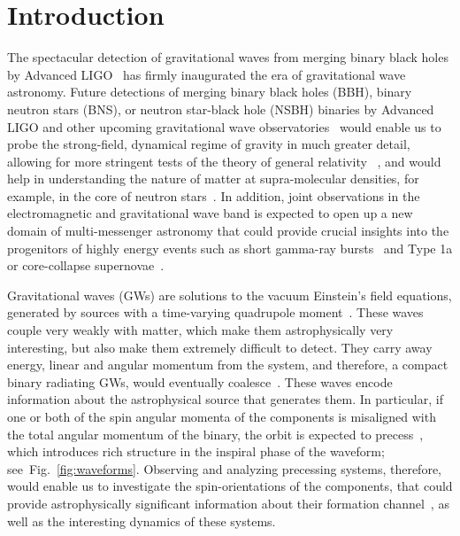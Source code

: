\chapter{Introduction}

The spectacular detection of gravitational waves from merging binary black
holes by Advanced LIGO~\cite{Event_0, Event_2} has firmly inaugurated the era
of gravitational wave astronomy. Future detections of merging binary black
holes (BBH), binary neutron stars (BNS), or neutron star-black hole (NSBH)
binaries by Advanced LIGO and other upcoming  gravitational wave
observatories~\cite{KAGRA, Virgo, LIGO_india} would enable us to probe the
strong-field, dynamical regime of gravity in much greater detail, allowing for
more stringent tests of the theory of general relativity ~\cite{Berti2015}, and
would help in understanding the nature of matter at supra-molecular densities,
for example, in the core of neutron stars~\cite{Agathos,Chatziioannou}. In
addition, joint observations in the electromagnetic and gravitational wave band
is expected to open up a new domain of multi-messenger astronomy that could
provide crucial insights into the progenitors of highly energy events such as
short gamma-ray bursts~\cite{Arun2014} and Type 1a or core-collapse
supernovae~\cite{Falta2011,Ott2013}.

Gravitational waves (GWs) are solutions to the vacuum Einstein's field
equations, generated by sources with a time-varying quadrupole
moment~\cite{Creighton}. These waves couple very weakly with matter, which
make them astrophysically very interesting, but also make them extremely
difficult to detect. They carry away energy, linear and angular momentum from
the system, and therefore, a compact binary radiating GWs, would eventually
coalesce~\cite{Peters1963}. These waves encode information about the
astrophysical source that generates them. In particular, if one or both of the
spin angular momenta of the components is misaligned with the total angular
momentum of the binary, the orbit is expected to
precess~\cite{Apostolatos1994}, which introduces rich structure in the
inspiral phase of the waveform; see~Fig.~\ref{fig:waveforms}. Observing and
analyzing precessing systems, therefore, would enable us to investigate the
spin-orientations of the components, that could provide astrophysically
significant information about their formation
channel~\cite{AstrophysicalImplications,Rodriguez}, as well as the interesting
dynamics of these systems.

